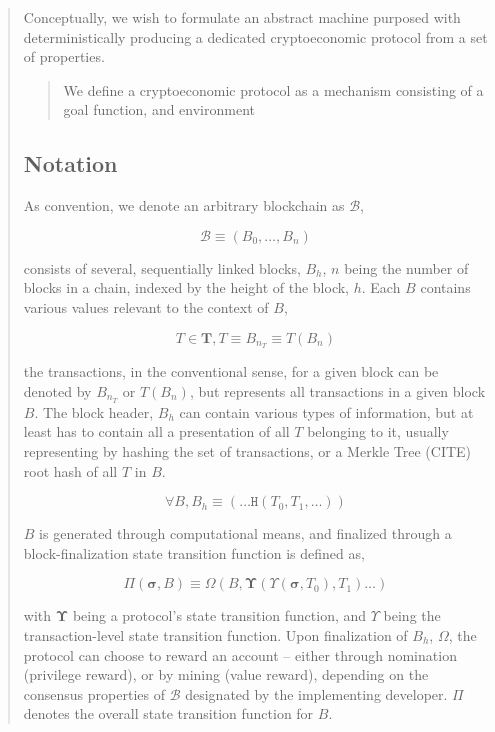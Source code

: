 \documentclass[12pt, titlepage, twocolumn]{report}
\begin{document}
\begin{quotation}
Conceptually, we wish to formulate an abstract machine purposed with deterministically producing a dedicated cryptoeconomic protocol from a set of properties.

\begin{quotation}
  We define a cryptoeconomic protocol as a mechanism consisting of a goal function, and environment
 \end{quotation} 


\subsection{Notation}
As convention, we denote an arbitrary blockchain as \(\boldsymbol{\mathcal{B}}\), 

\begin{equation}
	\boldsymbol{\mathcal{B}} \equiv (B_0, \ldots, B_n   )
\end{equation}

consists of several, sequentially linked blocks, \(B_h\), \(n\) being the number of blocks in a chain, indexed by the height of the block, \(h\). Each \(B\) contains various values relevant to the context of \(B\),

\begin{equation}
T \in \boldsymbol{T}, T \equiv B_{n_{T}} \equiv T(B_n)
\end{equation}

the transactions, in the conventional sense, for a given block can be denoted by \(B_{n_{T}}\) or \(T(B_n)\), but represents all transactions in a given block \(B\). The block header, \(B_h\) can contain various types of information, but at least has to contain all a presentation of all \(T\) belonging to it, usually representing by hashing the set of transactions, or a Merkle Tree (CITE) root hash of all \(T\) in \(B\).

\begin{equation}
\forall B, B_h \equiv (\ldots \texttt{H}(T_0, T_1, \ldots))
\end{equation}

\(B\) is generated through computational means, and finalized through a block-finalization state transition function is defined as,

\begin{equation}
\Pi (\boldsymbol{\sigma}, B) \equiv \Omega(B, \boldsymbol{\Upsilon}(\Upsilon(\boldsymbol{\sigma},T_0), T_1) \ldots )
\end{equation}

with \(\boldsymbol{\Upsilon}\) being a protocol's state transition function, and \(\Upsilon\) being the transaction-level state transition function. Upon finalization of \(B_h\), \(\Omega\), the protocol can choose to reward an account -- either through nomination (privilege reward), or by mining (value reward), depending on the consensus properties of \(\boldsymbol{\mathcal{B}}\) designated by the implementing developer. \(\Pi\) denotes the overall state transition function for \(B\).



\end{quotation}
\end{document}
